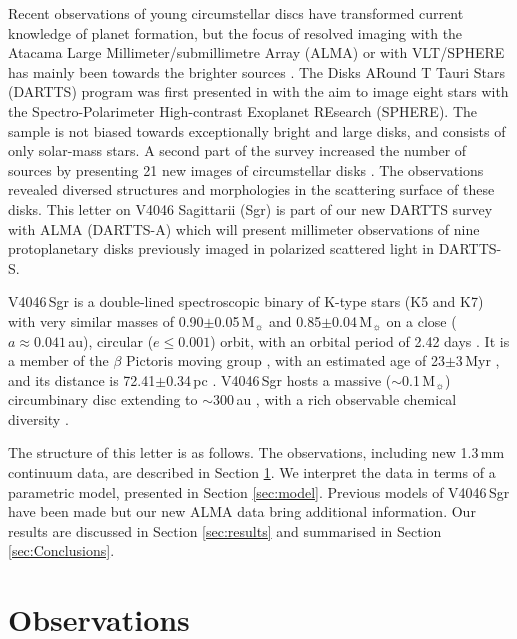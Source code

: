 \documentclass[letters,usenatbib,times]{mnras}
\begin{document}
Recent observations of young circumstellar discs have transformed  current knowledge of planet formation, but the focus of resolved imaging with the Atacama Large Millimeter/submillimetre Array (ALMA) or with VLT/SPHERE has  mainly been towards the brighter sources \citep[see][for a review]{Andrews2020arXiv200105007A}. The Disks ARound T Tauri Stars (DARTTS) program was first presented in \citet{Avenhaus_2018} with the aim to image eight stars with the Spectro-Polarimeter High-contrast Exoplanet REsearch (SPHERE). The sample is not biased towards exceptionally bright and large disks, and consists of only solar-mass stars. A second part of the survey increased the number of sources by presenting 21 new images of circumstellar disks \citep{Garufi2020}. The observations revealed diversed structures and morphologies in the scattering surface of these disks. This letter on V4046 Sagittarii (Sgr) is part of our new DARTTS survey with ALMA (DARTTS-A) which will present millimeter observations of nine protoplanetary disks previously imaged in polarized scattered light in DARTTS-S.  



V4046\,Sgr is a double-lined spectroscopic binary of K-type stars (K5 and K7) with very similar masses of 0.90$\pm$0.05\,M$_{\sun}$ and 0.85$\pm$0.04\,M$_{\sun}$ \citep{Rosenfeld_2012} on a close ($a \approx 0.041$\,au), circular ($e\leq0.001$) orbit, with an orbital period of 2.42 days \citep{refId0}. It is a member of the $\beta$ Pictoris moving group \citep{Zuckerman_2004}, with an estimated age of 23$\pm$3\,Myr \citep{Mamajek_2014}, and its distance is  72.41$\pm$0.34\,pc \citep{Gaia}. V4046\,Sgr hosts a massive ($\sim$0.1\,M$_{\sun}$) circumbinary disc extending to $\sim$300\,au \citep{Rosenfeld_2013, Rodriguez_2010}, with a rich observable chemical  diversity  \citep{Kastner_2018}. 


The structure of this letter is as follows. The observations, including  new 1.3\,mm continuum data, are described in Section \ref{sec:Observations}. We interpret the data in terms of a parametric model,  presented in Section \ref{sec:model}. Previous models of V4046\,Sgr have been made \citep{Ru_z_Rodr_guez_2019, Rosenfeld_2013, 2019ApJ...882..160Q} but our new ALMA data bring additional information. Our results are discussed in  Section \ref{sec:results} and summarised in  Section \ref{sec:Conclusions}.

\section{Observations} \label{sec:Observations}
\end{document}
